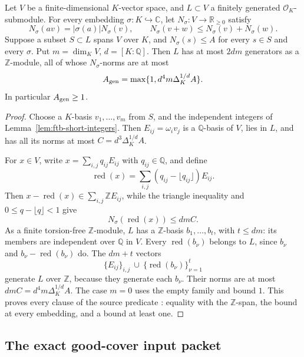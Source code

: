 \begin{srproposition}\label{prop:ftb-short-generators}
Let \(V\) be a finite-dimensional \(K\)-vector space, and \(L\subset V\)
a finitely generated \(\mathcal O_K\)-submodule.
For every embedding \(\sigma:K\hookrightarrow\mathbb C\), let
\(N_\sigma:V\to\mathbb R_{\ge0}\) satisfy
\[
 N_\sigma(av)=|\sigma(a)|N_\sigma(v),\qquad
 N_\sigma(v+w)\le N_\sigma(v)+N_\sigma(w).
\]
Suppose a subset \(S\subset L\) spans \(V\) over \(K\), and
\(N_\sigma(s)\le A\) for every \(s\in S\) and every \(\sigma\).
Put \(m=\dim_KV\), \(d=[K:\mathbb Q]\).
Then \(L\) has at most \(2dm\) generators as a \(\mathbb Z\)-module,
all of whose \(N_\sigma\)-norms are at most
\[
 A_{\rm gen}=\max\{1,d^4m\Delta_K^{1/d}A\}.
\]
In particular \(A_{\rm gen}\ge1\).
\end{srproposition}
\begin{proof}
Choose a \(K\)-basis \(v_1,\ldots,v_m\) from \(S\), and the independent
integers of Lemma~\ref{lem:ftb-short-integers}.
Then \(E_{ij}=\omega_i v_j\) is a \(\mathbb Q\)-basis of \(V\), lies in
\(L\), and has all its norms at most
\(C=d^3\Delta_K^{1/d}A\).

For \(x\in V\), write \(x=\sum_{i,j}q_{ij}E_{ij}\) with
\(q_{ij}\in\mathbb Q\), and define
\[
 \operatorname{red}(x)
       =\sum_{i,j}(q_{ij}-\lfloor q_{ij}\rfloor)E_{ij}.
\]
Then
\(x-\operatorname{red}(x)\in\sum_{i,j}\mathbb Z E_{ij}\), while the
triangle inequality and \(0\le q-\lfloor q\rfloor<1\) give
\[
 N_\sigma(\operatorname{red}(x))\le dmC .
\]
As a finite torsion-free \(\mathbb Z\)-module, \(L\) has a
\(\mathbb Z\)-basis \(b_1,\ldots,b_t\), with \(t\le dm\):
its members are independent over \(\mathbb Q\) in \(V\).
Every \(\operatorname{red}(b_\nu)\) belongs to \(L\), since \(b_\nu\)
and \(b_\nu-\operatorname{red}(b_\nu)\) do.
The \(dm+t\) vectors
\[
 \{E_{ij}\}_{i,j}\ \cup\
       \{\operatorname{red}(b_\nu)\}_{\nu=1}^t
\]
generate \(L\) over \(\mathbb Z\), because they generate each \(b_\nu\).
Their norms are at most \(dmC=d^4m\Delta_K^{1/d}A\).
The case \(m=0\) uses the empty family and bound \(1\).
This proves every clause of the source predicate
: equality with the \(\mathbb Z\)-span,
the bound at every embedding, and a bound at least one.
\end{proof}

\subsection{The exact good-cover input packet}
\label{subsec:ftb-good-cover-packet}

